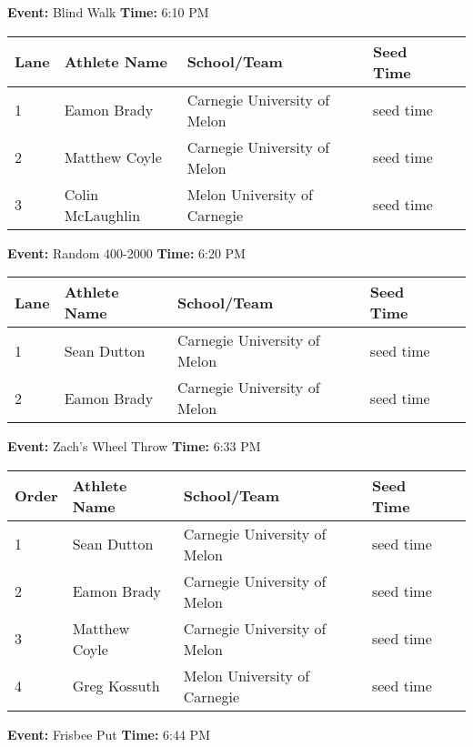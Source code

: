 \documentclass[11pt]{article}
\begin{document}
\textbf{Event:} Blind Walk \quad \textbf{Time:} 6:10 PM 

\vspace{1em}
\begin{tabular}{@{}lllll@{}}
\toprule
\textbf{Lane} & \textbf{Athlete Name} & \textbf{School/Team} & \textbf{Seed Time} \\
\midrule
1 & Eamon Brady & Carnegie University of Melon & seed time &\\
2 & Matthew Coyle & Carnegie University of Melon & seed time &\\
3 & Colin McLaughlin & Melon University of Carnegie & seed time &\\
\bottomrule
\end{tabular}
\vspace{2.5em}


\textbf{Event:} Random 400-2000 \quad \textbf{Time:} 6:20 PM 

\vspace{1em}
\begin{tabular}{@{}lllll@{}}
\toprule
\textbf{Lane} & \textbf{Athlete Name} & \textbf{School/Team} & \textbf{Seed Time} \\
\midrule
1 & Sean Dutton & Carnegie University of Melon & seed time &\\
2 & Eamon Brady & Carnegie University of Melon & seed time &\\
\bottomrule
\end{tabular}
\vspace{2.5em}


\textbf{Event:} Zach's Wheel Throw \quad \textbf{Time:} 6:33 PM 

\vspace{1em}
\begin{tabular}{@{}lllll@{}}
\toprule
\textbf{Order} & \textbf{Athlete Name} & \textbf{School/Team} & \textbf{Seed Time} \\
\midrule
1 & Sean Dutton & Carnegie University of Melon & seed time &\\
2 & Eamon Brady & Carnegie University of Melon & seed time &\\
3 & Matthew Coyle & Carnegie University of Melon & seed time &\\
4 & Greg Kossuth & Melon University of Carnegie & seed time &\\
\bottomrule
\end{tabular}
\vspace{2.5em}


\textbf{Event:} Frisbee Put \quad \textbf{Time:} 6:44 PM 
\end{document}
